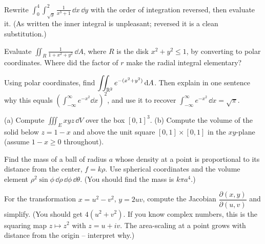 \begin{exercise}
\label{ch34:exr-order}
Rewrite
$\displaystyle\int_0^4\!\int_{\sqrt y}^{2} \frac{1}{x^3+1}\,\dd x\,\dd y$
with the order of integration reversed, then evaluate it. (As written the inner
integral is unpleasant; reversed it is a clean substitution.)
\end{exercise}

\begin{exercise}
\label{ch34:exr-polar}
Evaluate $\displaystyle\iint_R \frac{1}{1+x^2+y^2}\,\dd A$, where $R$ is the disk
$x^2+y^2\le 1$, by converting to polar coordinates. Where did the factor of $r$
make the radial integral elementary?
\end{exercise}

\begin{exercise}
\label{ch34:exr-gauss}
Using polar coordinates, find
$\displaystyle\iint_{\mathbb{R}^2} e^{-(x^2+y^2)}\,\mathrm{d} A$. Then explain in one sentence
why this equals $\left(\int_{-\infty}^\infty e^{-x^2}\dd x\right)^2$, and use it
to recover $\int_{-\infty}^\infty e^{-x^2}\,\dd x=\sqrt\pi$.
\end{exercise}

\begin{exercise}
\label{ch34:exr-triple}
(a) Compute $\displaystyle\iiint_E xyz\,\dd V$ over the box $[0,1]^3$.
(b) Compute the volume of the solid below $z=1-x$ and above the unit square
$[0,1]\times[0,1]$ in the $xy$-plane (assume $1-x\ge 0$ throughout).
\end{exercise}

\begin{exercise}
\label{ch34:exr-spherical}
Find the mass of a ball of radius $a$ whose density at a point is proportional to
its distance from the center, $f=k\rho$. Use spherical coordinates and the volume
element $\rho^2\sin\phi\,\dd\rho\,\dd\phi\,\dd\theta$. (You should find the mass is
$k\pi a^4$.)
\end{exercise}

\begin{exercise}
\label{ch34:exr-jacobian}
For the transformation $x=u^2-v^2$, $y=2uv$, compute the Jacobian
$\dfrac{\partial(x,y)}{\partial(u,v)}$ and simplify. (You should get
$4(u^2+v^2)$. If you know complex numbers, this is the squaring map
$z\mapsto z^2$ with $z=u+iv$. The area-scaling at a point grows with distance
from the origin -- interpret why.)
\end{exercise}

